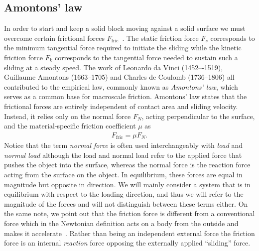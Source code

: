 


\subsection{Amontons’ law}
In order to start and keep a solid block moving against a solid surface we must
overcome certain frictional forces $F_{\text{fric}}$~\cite{gnecco_meyer_2015}.
The static friction force $F_s$ corresponds to the minimum tangential force
required to initiate the sliding while the kinetic friction force $F_k$
corresponds to the tangential force needed to sustain such a sliding at a steady
speed. The work of Leonardo da Vinci (1452–-1519), Guillaume Amontons (1663--1705)
and Charles de Coulomb (1736--1806) all contributed to the empirical law,
commonly known as \textit{Amontons’ law}, which serves as a common base for macroscale
friction. Amontons’ law states that the frictional forces are entirely
independent of contact area and sliding velocity. Instead, it relies only on
the normal force $F_N$, acting perpendicular to the surface, and the material-specific friction coefficient $\mu$ as
\begin{align}
  F_{\text{fric}} = \mu F_N.
  \label{eq:amonton}
\end{align}
Notice that the term \textit{normal force} is often used interchangeably with \textit{load} and \textit{normal load} although the load and normal load refer to the applied force that pushes the object into the surface, whereas the normal force is the reaction force acting from the surface on the object. In equilibrium, these forces are equal in magnitude but opposite in direction. We will mainly consider a system that is in equilibrium with respect to the loading direction, and thus we will refer to the magnitude of the forces and will not distinguish between these terms either. On the same note, we point out that the friction force is different from a conventional force which in the Newtonian definition acts on a body from the outside and makes it accelerate~\cite{gao_frictional_2004}. Rather than being an independent external force the friction force is an internal \textit{reaction} force opposing the externally applied ``sliding'' force. 

